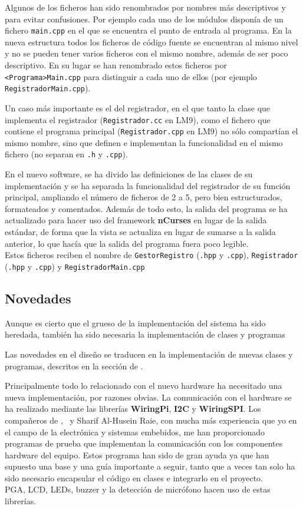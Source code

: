Algunos de los ficheros han sido renombrados por nombres más descriptivos y para evitar confusiones. Por ejemplo cada uno de los módulos disponía de un fichero \texttt{main.cpp} en el que se encuentra el punto de entrada al programa. En la nueva estructura todos los ficheros de código fuente se encuentran al mismo nivel y no se pueden tener varios ficheros con el mismo nombre, además de ser poco descriptivo. En su lugar se han renombrado estos ficheros por \texttt{<Programa>Main.cpp} para distinguir a cada uno de ellos (por ejemplo \texttt{RegistradorMain.cpp}).

Un caso más importante es el del registrador, en el que tanto la clase que implementa el registrador (\texttt{Registrador.cc} en \acrshort{LM9}), como el fichero que contiene el programa principal (\texttt{Registrador.cpp} en \acrshort{LM9}) no sólo compartían el mismo nombre, sino que definen e implementan la funcionalidad en el mismo fichero (no separan en \texttt{.h} y \texttt{.cpp}).

En el nuevo software, se ha divido las definiciones de las clases de su implementación y se ha separada la funcionalidad del registrador de su función principal, ampliando el número de ficheros de 2 a 5, pero bien estructurados, formateados y comentados. Además de todo esto, la salida del programa se ha actualizado para hacer uso del framework \textbf{nCurses} en lugar de la salida estándar, de forma que la vista se actualiza en lugar de sumarse a la salida anterior, lo que hacía que la salida del programa fuera poco legible. \\
Estos ficheros reciben el nombre de \texttt{GestorRegistro} (\texttt{.hpp} y \texttt{.cpp}), \texttt{Registrador} (\texttt{.hpp} y \texttt{.cpp}) y \texttt{RegistradorMain.cpp}

\subsection{Novedades}

Aunque es cierto que el grueso de la implementación del sistema ha sido heredada, también ha sido necesaria la implementación de clases y programas

Las novedades en el diseño se traducen en la implementación de nuevas clases y programas, descritos en la sección de .

Principalmente todo lo relacionado con el nuevo hardware ha necesitado una nueva implementación, por razones obvias. La comunicación con el hardware se ha realizado mediante las librerías \textbf{WiringPi}, \textbf{I2C} y \textbf{WiringSPI}. Los compañeros de , \myMateLuis\ y Sharif Al-Husein Raie, con mucha más experiencia que yo en el campo de la electrónica y sistemas embebidos, me han proporcionado programas de prueba que implementan la comunicación con los componentes hardware del equipo. Estos programa han sido de gran ayuda ya que han supuesto una base y una guía importante a seguir, tanto que a veces tan solo ha sido necesario encapsular el código en clases e integrarlo en el proyecto.\\
\acrshort{PGA}, \acrshort{LCD}, \acrshort{LED}s, buzzer y la detección de micrófono hacen uso de estas librerías.

